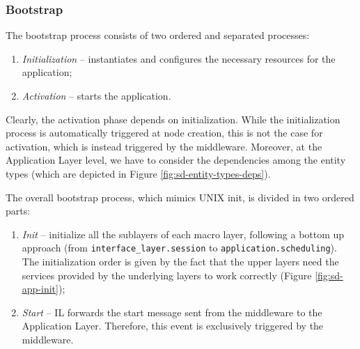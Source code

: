 \subsubsection{Bootstrap}

The bootstrap process consists of two ordered and separated processes:

\begin{enumerate}
  \item \textit{Initialization} -- instantiates and configures the necessary
    resources for the application;
  \item \textit{Activation} -- starts the application.
\end{enumerate}

Clearly, the activation phase depends on initialization.
While the initialization process is automatically triggered at node creation,
this is not the case for activation, which is instead triggered by the
middleware.
Moreover, at the Application Layer level, we have to consider the dependencies
among the entity types (which are depicted in Figure
\ref{fig:sd-entity-types-deps}).

The overall bootstrap process, which mimics UNIX init\cite{online-tlsag},
is divided in two ordered parts:
\begin{enumerate}
  \item \textit{Init} -- initialize all the sublayers of each macro layer,
  following a bottom up approach (from \verb|interface_layer.session| to
  \verb|application.scheduling|).
  The initialization order is given by the fact that the upper
  layers need the services provided by the underlying layers to work
  correctly (Figure \ref{fig:sd-app-init});
  \item \textit{Start} -- IL forwards the start message sent from the
  middleware to the Application Layer.
  Therefore, this event is exclusively triggered by the middleware.
\end{enumerate}

